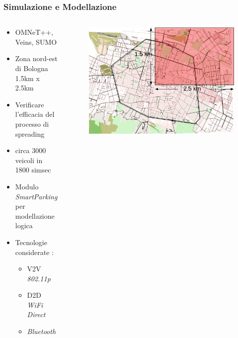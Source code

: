 \documentclass{beamer}
\begin{document}
\begin{frame}
\frametitle{Simulazione e Modellazione}
\begin{columns}
  \begin{column}{0.65\textwidth}
    \begin{itemize}
      \item OMNeT++, Veins, SUMO
      \item Zona nord-est di Bologna 1.5km x 2.5km
      \item Verificare l’efficacia del processo di spreading
      \item circa 3000 veicoli in 1800 simsec
      \item Modulo \textit{SmartParking} per modellazione logica
      \item Tecnologie considerate : 
	\begin{itemize}
	  \item V2V \textit{802.11p}
	  \item D2D \textit{WiFi Direct} 
	  \item \textit{Bluetooth}
	\end{itemize}
    \end{itemize}
  \end{column}

  \begin{column}{0.35\textwidth}
    \begin{figure}
    \includegraphics[width=\columnwidth]{img/sumo-bolo2.png}
    \end{figure}
  \end{column}
\end{columns}
\end{frame}
\end{document}
